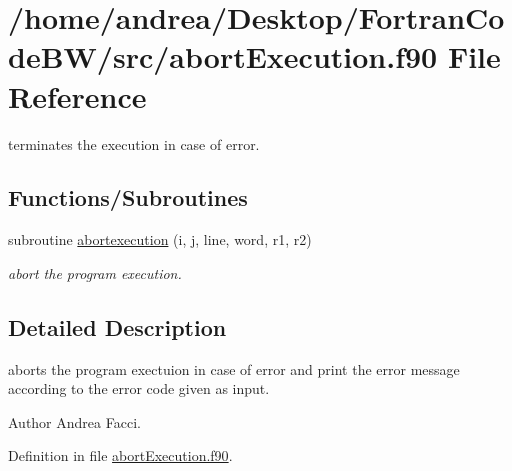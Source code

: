 \hypertarget{abort_execution_8f90}{\section{/home/andrea/\-Desktop/\-Fortran\-Code\-B\-W/src/abort\-Execution.f90 File Reference}
\label{abort_execution_8f90}
}


terminates the execution in case of error.  


\subsection*{Functions/\-Subroutines}
\begin{DoxyCompactItemize}
\item 
subroutine \hyperlink{abort_execution_8f90_a77d76bae2ec6572915c5c3e0795bcb76}{abortexecution} (i, j, line, word, r1, r2)
\begin{DoxyCompactList}\small\item\em abort the program execution. \end{DoxyCompactList}\end{DoxyCompactItemize}


\subsection{Detailed Description}
\begin{DoxyVerb}aborts the program exectuion in case of error and print the error message
according to the error code given as input.
\end{DoxyVerb}
 \begin{DoxyAuthor}{Author}
Andrea Facci. 
\end{DoxyAuthor}


Definition in file \hyperlink{abort_execution_8f90_source}{abort\-Execution.\-f90}.



